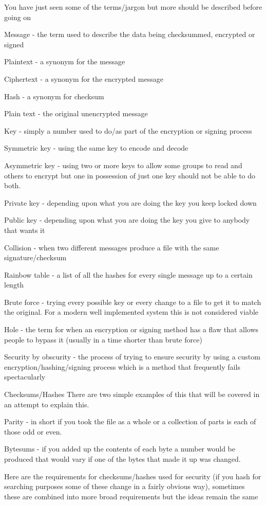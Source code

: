 \documentclass[
]{book}
\begin{document}
You have just seen some of the terms/jargon but more should be described before going on

Message - the term used to describe the data being checksummed, encrypted or signed

Plaintext - a synonym for the message

Ciphertext - a synonym for the encrypted message

Hash - a synonym for checksum

Plain text - the original unencrypted message

Key - simply a number used to do/as part of the encryption or signing process

Symmetric key - using the same key to encode and decode

Asymmetric key - using two or more keys to allow some groups to read and others to encrypt but one in possession of just one key should not be able to do both.

Private key - depending upon what you are doing the key you keep locked down

Public key - depending upon what you are doing the key you give to anybody that wants it

Collision - when two different messages produce a file with the same signature/checksum

Rainbow table - a list of all the hashes for every single message up to a certain length

Brute force - trying every possible key or every change to a file to get it to match the original. For a modern well implemented system this is not considered viable

Hole - the term for when an encryption or signing method has a flaw that allows people to bypass it (usually in a time shorter than brute force)

Security by obscurity - the process of trying to ensure security by using a custom encryption/hashing/signing process which is a method that frequently fails spectacularly

Checksums/Hashes There are two simple examples of this that will be covered in an attempt to explain this.

Parity - in short if you took the file as a whole or a collection of parts is each of those odd or even.

Bytesums - if you added up the contents of each byte a number would be produced that would vary if one of the bytes that made it up was changed.

Here are the requirements for checksums/hashes used for security (if you hash for searching purposes some of these change in a fairly obvious way), sometimes these are combined into more broad requirements but the ideas remain the same
\end{document}
